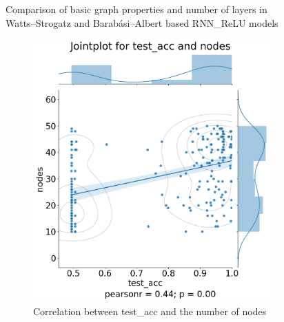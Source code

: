 \begin{figure}[H]
\caption[Comparison of basic graph properties and number of layers in WS and BA based RNN\_ReLU models]{Comparison of basic graph properties and number of layers in Watts–Strogatz and Barabási–Albert based RNN\_ReLU models} \label{fig:relu_graphs}
\end{figure}

\begin{figure}[H]
    \centering
    \begin{subfigure}{0.45\textwidth}
        \includegraphics[width=\linewidth]{images/results/random/relu/jointplot_test_acc_nodes.png}
        \caption{Correlation between test\_acc and the number of nodes} \label{fig:jp_relu_node}
    \end{subfigure}%
    \hfill
    \begin{subfigure}{0.45\textwidth}

\end{subfigure}
\end{figure}
